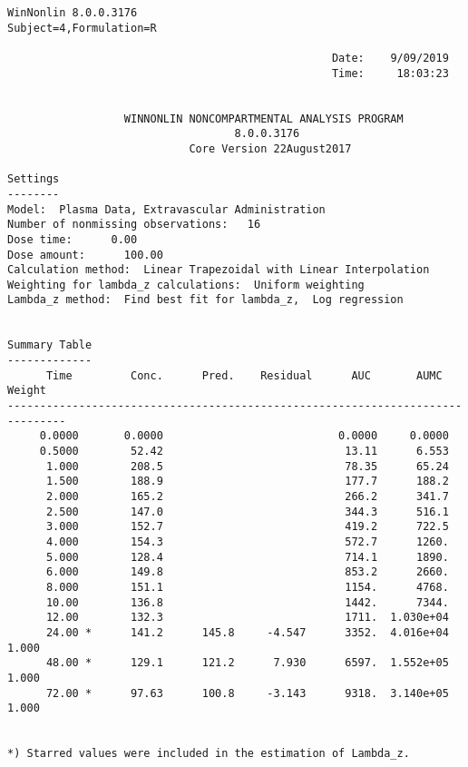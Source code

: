 \documentclass[12pt,a4paper]{article}
\begin{document}
\begin{verbatim}
WinNonlin 8.0.0.3176
Subject=4,Formulation=R

                                                  Date:    9/09/2019
                                                  Time:     18:03:23


                  WINNONLIN NONCOMPARTMENTAL ANALYSIS PROGRAM
                                   8.0.0.3176
                            Core Version 22August2017

Settings
--------
Model:  Plasma Data, Extravascular Administration
Number of nonmissing observations:   16
Dose time:      0.00
Dose amount:      100.00
Calculation method:  Linear Trapezoidal with Linear Interpolation
Weighting for lambda_z calculations:  Uniform weighting
Lambda_z method:  Find best fit for lambda_z,  Log regression


Summary Table
-------------
      Time         Conc.      Pred.    Residual      AUC       AUMC      Weight
-------------------------------------------------------------------------------
     0.0000       0.0000                           0.0000     0.0000
     0.5000        52.42                            13.11      6.553
      1.000        208.5                            78.35      65.24
      1.500        188.9                            177.7      188.2
      2.000        165.2                            266.2      341.7
      2.500        147.0                            344.3      516.1
      3.000        152.7                            419.2      722.5
      4.000        154.3                            572.7      1260.
      5.000        128.4                            714.1      1890.
      6.000        149.8                            853.2      2660.
      8.000        151.1                            1154.      4768.
      10.00        136.8                            1442.      7344.
      12.00        132.3                            1711.  1.030e+04
      24.00 *      141.2      145.8     -4.547      3352.  4.016e+04      1.000
      48.00 *      129.1      121.2      7.930      6597.  1.552e+05      1.000
      72.00 *      97.63      100.8     -3.143      9318.  3.140e+05      1.000


*) Starred values were included in the estimation of Lambda_z.



\end{verbatim}
\end{document}

